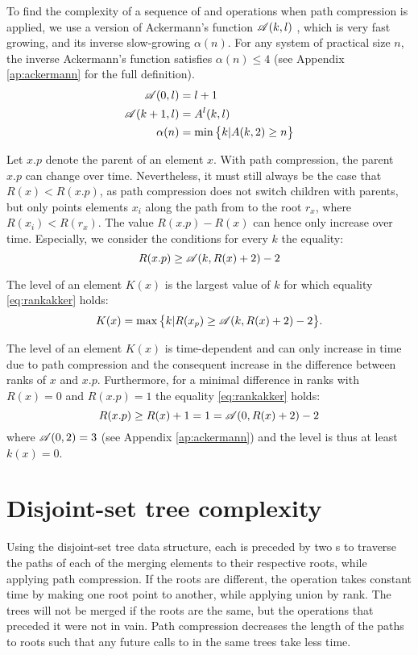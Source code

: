 To find the complexity of a sequence of  and  operations when path compression is applied, we use a version of Ackermann's function $\mathscr{A}(k,l)$ \cite{ackermann1928hilbertschen, kozen1992design}, which is very fast growing, and its inverse slow-growing $\alpha(n)$. For any system of practical size $n$, the inverse Ackermann's function satisfies $\alpha(n)\leq 4$ (see Appendix \ref{ap:ackermann} for the full definition). 
\begin{align}
  \nonumber \mathscr{A}(0,l) &= l + 1\\
  \mathscr{A}(k+1,l) &= A^l(k,l) \\
  \nonumber \alpha(n) &= \min\big\{k | A(k,2) \geq n \big\}
\end{align}

Let $x.p$ denote the parent of an element $x$. With path compression, the parent $x.p$ can change over time. Nevertheless, it must still always be the case that $R(x)<R(x.p)$, as path compression does not switch children with parents, but only points elements $x_i$ along the path from to the root $r_x$, where $R(x_i)<R(r_x)$. The value $R(x.p) - R(x)$ can hence only increase over time. Especially, we consider the conditions for every $k$ the equality:
\begin{equation}\label{eq:rankakker}
  R(x.p)\geq \mathscr{A}(k,R(x)+2)-2
\end{equation}
\begin{definition}
  The level of an element $K(x)$ is the largest value of $k$ for which equality \eqref{eq:rankakker} holds: 
  \begin{equation}
    K(x) = \max \big\{ k |  R(x_p)\geq \mathscr{A}(k,R(x)+2)-2\big\}.
  \end{equation}
\end{definition}
The level of an element $K(x)$ is time-dependent and can only increase in time due to path compression and the consequent increase in the difference between ranks of $x$ and $x.p$. Furthermore, for a minimal difference in ranks with $R(x) = 0$ and $R(x.p)=1$ the equality \eqref{eq:rankakker} holds:
\begin{equation*}
  R(x.p) \geq R(x) + 1 = 1 = \mathscr{A}(0,R(x) + 2)-2
\end{equation*}
where $\mathscr{A}(0,2)=3$ (see Appendix \ref{ap:ackermann}) and the level is thus at least $k(x)=0$. 

\section{Disjoint-set tree complexity}
Using the disjoint-set tree data structure, each  is preceded by two s to traverse the paths of each of the merging elements to their respective roots, while applying path compression. If the roots are different, the  operation takes constant time by making one root point to another, while applying union by rank. The trees will not be merged if the roots are the same, but the  operations that preceded it were not in vain. Path compression decreases the length of the paths to roots such that any future calls to  in the same trees take less time.

